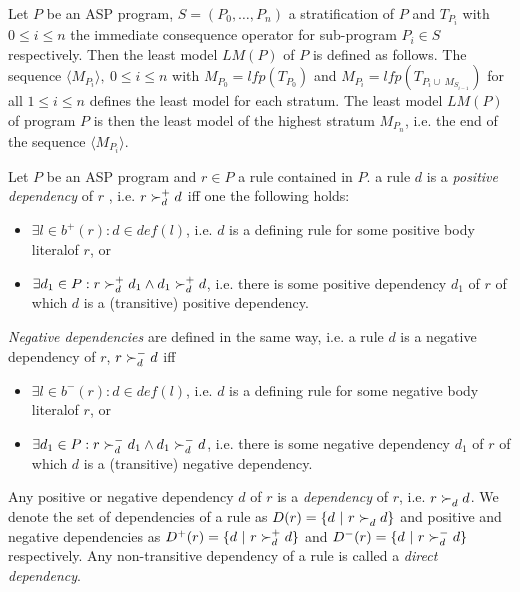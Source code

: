 \begin{definition}
\label{def:prelims-asp-semantics-stratified-eval}
Let $P$ be an ASP program, $S = (P_0,\ldots,P_n)$ a stratification of $P$ and $T_{P_i}$ with $0 \leq i \leq n$ the immediate consequence operator for sub-program $P_i \in S$ respectively. Then the least model $\mathit{LM}(P)$ of $P$ is defined as follows.
The sequence $\langle M_{P_i} \rangle,\ 0 \leq i \leq n$ with $M_{P_0} = \mathit{lfp}(T_{P_0})$ and $M_{P_i} = \mathit{lfp}(T_{P_i \cup\ M_{S_{i-1}}})$ for all $1 \leq i \leq n$ defines the least model for each stratum. The least model $LM(P)$ of program $P$ is then the least model of the highest stratum $M_{P_n}$, i.e. the end of the sequence $\langle M_{P_i} \rangle$.
\end{definition}

\begin{definition}[Dependencies]
\label{def:prelims-asp-semantics-dependencies}
Let $P$ be an ASP program and $r \in P$ a rule contained in $P$. a rule $d$ is a \emph{positive dependency} of $r$ , i.e. $ r \succ_{d}^{+} d$ iff one the following holds:
\begin{itemize}
	\item $\exists l \in b^{+}(r): d \in \mathit{def}(l) $, i.e. $d$ is a defining rule for some positive body literalof $r$, or
	\item $\exists d_1 \in P: r \succ_{d}^{+} d_1 \land d_1 \succ_{d}^{+} d$, i.e. there is some positive dependency $d_1$ of $r$ of which $d$ is a (transitive) positive dependency.
\end{itemize}
\emph{Negative dependencies} are defined in the same way, i.e. a rule $d$ is a negative dependency of $r$, $r \succ_{d}^{-} d$ iff
\begin{itemize}
	\item $\exists l \in b^{-}(r): d \in \mathit{def}(l)$, i.e. $d$ is a defining rule for some negative body literalof $r$, or
	\item $\exists d_1 \in P: r \succ_{d}^{-} d_1 \land d_1 \succ_{d}^{-} d$, i.e. there is some negative dependency $d_1$ of $r$ of which $d$ is a (transitive) negative dependency.
\end{itemize}
Any positive or negative dependency $d$ of $r$ is a \emph{dependency} of $r$, i.e. $r \succ_{d}^{} d$.
We denote the set of dependencies of a rule as $D(r) = \{ d\ |\ r \succ_{d}^{} d\}$ and positive and negative dependencies as $D^{+}(r) = \{ d\ |\ r \succ_{d}^{+} d\}$ and $D^{-}(r) = \{ d\ |\ r \succ_{d}^{-} d\}$ respectively. Any non-transitive dependency of a rule is called a \emph{direct dependency}.
\end{definition}

